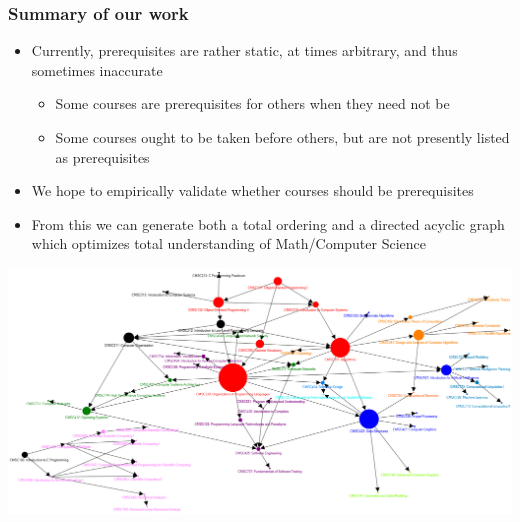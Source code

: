\documentclass{beamer}
\begin{document}
\begin{frame}
\frametitle{Summary of our work}
\begin{itemize}
\item Currently, prerequisites are rather static, at times arbitrary, and thus sometimes inaccurate 
\begin{itemize}
\item Some courses are prerequisites for others when they need not be
\item Some courses ought to be taken before others, but are not presently listed as prerequisites
\end{itemize}
\item We hope to empirically validate whether courses should be prerequisites
\item From this we can generate both a total ordering and a directed acyclic graph which optimizes total understanding of Math/Computer Science
\end{itemize} 
\centerline{\includegraphics[width=0.6\columnwidth]{dag.png}}
\end{frame}
\end{document}
